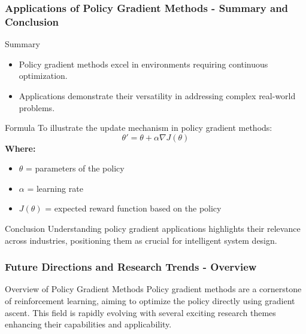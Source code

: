 \documentclass{beamer}
\begin{document}
\begin{frame}[fragile]
    \frametitle{Applications of Policy Gradient Methods - Summary and Conclusion}
    \begin{block}{Summary}
        \begin{itemize}
            \item Policy gradient methods excel in environments requiring continuous optimization.
            \item Applications demonstrate their versatility in addressing complex real-world problems.
        \end{itemize}
    \end{block}

    \begin{block}{Formula}
        To illustrate the update mechanism in policy gradient methods:
        \begin{equation}
            \theta' = \theta + \alpha \nabla J(\theta)
        \end{equation}
        \textbf{Where:}
        \begin{itemize}
            \item $\theta$ = parameters of the policy
            \item $\alpha$ = learning rate
            \item $J(\theta)$ = expected reward function based on the policy
        \end{itemize}
    \end{block}

    \begin{block}{Conclusion}
        Understanding policy gradient applications highlights their relevance across industries, positioning them as crucial for intelligent system design.
    \end{block}
\end{frame}

\begin{frame}[fragile]
    \frametitle{Future Directions and Research Trends - Overview}
    \begin{block}{Overview of Policy Gradient Methods}
        Policy gradient methods are a cornerstone of reinforcement learning, aiming to optimize the policy directly using gradient ascent. This field is rapidly evolving with several exciting research themes enhancing their capabilities and applicability.
    \end{block}
\end{frame}
\end{document}

